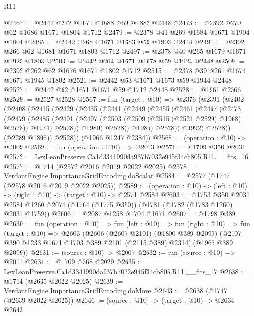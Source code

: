 \begin{lexlean}{R11}
\begin{coremodule}
@2467 := @2442 @272 @1671 @1688 @59 @1882 @2448
@2473 := @2392 @270 @62 @1686 @1671 @1804 @1712
@2479 := @2378 @41 @269 @1684 @1671 @1904 @1804
@2485 := @2442 @268 @1671 @1683 @59 @1903 @2448
@2491 := @2392 @266 @62 @1681 @1671 @1803 @1712
@2497 := @2378 @40 @265 @1679 @1671 @1925 @1803
@2503 := @2442 @264 @1671 @1678 @59 @1924 @2448
@2509 := @2392 @262 @62 @1676 @1671 @1802 @1712
@2515 := @2378 @39 @261 @1674 @1671 @1945 @1802
@2521 := @2442 @63 @1671 @1673 @59 @1944 @2448
@2527 := @2442 @62 @1671 @1671 @59 @1712 @2448
@2528 := @1961 @2366
@2529 := @2527 @2528
@2567 := fun (target : @10) =>
  @2376
    (@2391
      (@2402
        (@2408
          (@2415
            (@2429
              (@2435
                (@2441
                  (@2449
                    (@2455
                      (@2461
                        (@2467
                          (@2473
                            (@2479
                              (@2485
                                (@2491
                                  (@2497 (@2503 (@2509 (@2515 (@2521 @2529) @1968) @2528)) @1974)
                                  @2528))
                              @1980)
                            @2528))
                        @1986)
                      @2528))
                  @1992)
                @2528))
            (@2289 @1806))
          @2528))
      (@1966 @1247 @2384))
@2568 := (operation : @10) -> @2009
@2569 := fun (operation : @10) => @2013
@2571 := @1709 @350 @2031
@2572 := LexLeanPreserve.Ca1d3341990da937b7032e945f34cb805.R11.__fits_16
@2577 := @1714 (@2572 @2016 @2019 @2022 @2025)
@2578 := VerdantEngine.ImportanceGridEncoding.doScalar
@2584 := @2577 (@1747 (@2578 @2016 @2019 @2022 @2025))
@2589 := (operation : @10) -> (left : @10) -> (right : @10) -> (target : @10) -> @2571 @2584
@2603 := @1753
    @350
    @2031
    @2584
    @1260
    @2074
    (@1764 (@1775 @350))
    (@1781 (@1782 (@1783 @1260) @2031 @1759))
@2606 := @2087 @1258 @1704 @1671
@2607 := @1798 @389
@2630 := fun (operation : @10) =>
  fun (left : @10) =>
  fun (right : @10) =>
  fun (target : @10) =>
  @2603
    (@2606
      (@2607 @2101)
      (@1800 @389 @2099)
      (@2107 @390 @1233 @1671 @1703 @389 @2101 (@2115 @389) @2314)
      (@1966 @389 @2099))
@2631 := (source : @10) -> @2007
@2632 := fun (source : @10) => @2011
@2634 := @1709 @368 @2029
@2635 := LexLeanPreserve.Ca1d3341990da937b7032e945f34cb805.R11.__fits_17
@2638 := @1714 (@2635 @2022 @2025)
@2639 := VerdantEngine.ImportanceGridEncoding.doMove
@2643 := @2638 (@1747 (@2639 @2022 @2025))
@2646 := (source : @10) -> (target : @10) -> @2634 @2643

\end{coremodule}
\end{lexlean}
